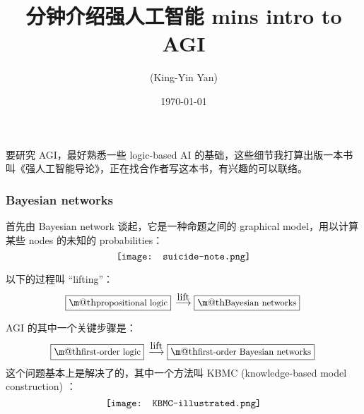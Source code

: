 \documentclass[orivec]{llncs}
\title{
\ifdefined\chinchin
5 分钟介绍强人工智能
\else
5 mins intro to AGI
\fi
}
\author{\usebox{\MyName} (King-Yin Yan)
}
\institute{General.Intelligence@Gmail.com}
\date{\today}
\makeatletter
\renewcommand{\boxed}[1]{\fbox{\m@th$\displaystyle\scalebox{0.9}{#1}$} \,}
\makeatother
\begin{document}
\let\labelitemi\labelitemii

\maketitle

\noindent
\makebox[\linewidth]{\small \today}

\setlength{\parindent}{0em}
\setlength{\parskip}{2.8ex plus0.8ex minus0.8ex}

\begin{abstract}
\end{abstract}


要研究 AGI，最好熟悉一些 logic-based AI 的基础，这些细节我打算出版一本书叫《强人工智能导论》，正在找合作者写这本书，有兴趣的可以联络。


\subsubsection{Bayesian networks}

首先由 Bayesian network 谈起，它是一种命题之间的 graphical model，用以计算某些 nodes 的未知的 probabilities：
\begin{equation}
\vcenter{\hbox{\texttt{[image: suicide-note.png]}}}
\end{equation}

以下的过程叫 ``lifting''：
\begin{equation}
	\boxed{propositional logic} \stackrel{\mbox{lift}}{\longrightarrow} \boxed{Bayesian networks}
\end{equation}

AGI 的其中一个关键步骤是：
\begin{equation}
\boxed{first-order logic} \stackrel{\mbox{lift}}{\longrightarrow} \boxed{first-order Bayesian networks}
\end{equation}
这个问题基本上是解决了的，其中一个方法叫 KBMC (knowledge-based model construction) ：
\begin{equation}
\vcenter{\hbox{\texttt{[image: KBMC-illustrated.png]}}}
\end{equation}
\end{document}
